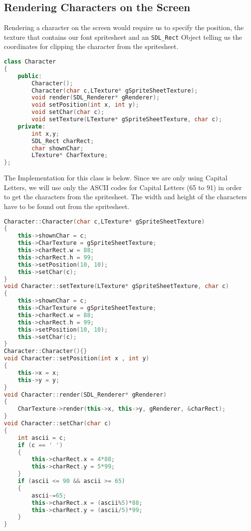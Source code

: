 \documentclass[11pt,fleqn]{book} %
\begin{document}
\subsection{Rendering Characters on the Screen}

Rendering a character on the screen would require us to specify the position, the texture that contains our font spritesheet and an \texttt{SDL\_Rect} Object telling us the coordinates for clipping the character from the spritesheet.

\begin{lstlisting}[language=C++, caption={Use of Array of Pointers and Destructors}]
class Character
{
    public:
        Character();
        Character(char c,LTexture* gSpriteSheetTexture);
        void render(SDL_Renderer* gRenderer);
        void setPosition(int x, int y);
        void setChar(char c);
        void setTexture(LTexture* gSpriteSheetTexture, char c);
    private:
        int x,y;
        SDL_Rect charRect;
        char shownChar;
        LTexture* CharTexture;
};
\end{lstlisting}

The Implementation for this class is below. Since we are only using Capital Letters, we will use only the ASCII codes for Capital Letters (65 to 91) in order to get the characters from the spritesheet. The width and height of the characters have to be found out from the spritesheet.

\begin{lstlisting}[language=C++, caption={Use of Array of Pointers and Destructors}]
Character::Character(char c,LTexture* gSpriteSheetTexture)
{
    this->shownChar = c;
    this->CharTexture = gSpriteSheetTexture;
    this->charRect.w = 88;
    this->charRect.h = 99;
    this->setPosition(10, 10);
    this->setChar(c);
}
void Character::setTexture(LTexture* gSpriteSheetTexture, char c)
{
    this->shownChar = c;
    this->CharTexture = gSpriteSheetTexture;
    this->charRect.w = 88;
    this->charRect.h = 99;
    this->setPosition(10, 10);
    this->setChar(c);
}
Character::Character(){}
void Character::setPosition(int x , int y)
{
    this->x = x;
    this->y = y;
}
void Character::render(SDL_Renderer* gRenderer)
{
    CharTexture->render(this->x, this->y, gRenderer, &charRect);
}
void Character::setChar(char c)
{
    int ascii = c;
    if (c == ' ')
    {
        this->charRect.x = 4*88;
        this->charRect.y = 5*99;
    }
    if (ascii <= 90 && ascii >= 65)
    {
        ascii-=65;
        this->charRect.x = (ascii%5)*88;
        this->charRect.y = (ascii/5)*99;
    }
}
\end{lstlisting}
\end{document}
